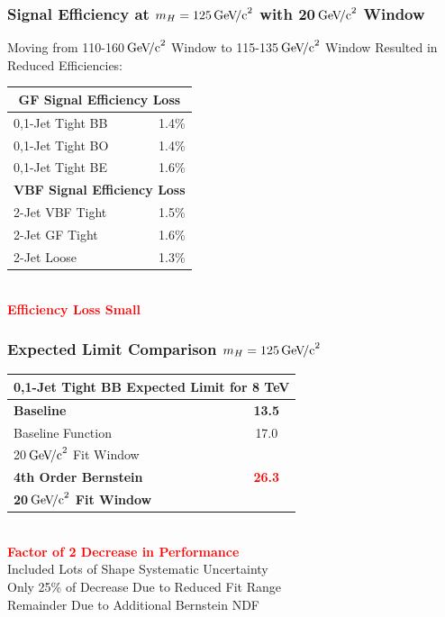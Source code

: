 \documentclass{beamer}
\newcommand{\GeVcc}{\ensuremath{\,\mathrm{Ge\kern -0.1em V\!/c}^2}}
\newcommand{\tredbf}[1]{\textcolor{red}{\bf #1}}
\begin{document}
\begin{frame}
\frametitle{Signal Efficiency at $m_H = 125 \GeVcc{}$ with 20\GeVcc{} Window}
\begin{center}
Moving from 110-160\GeVcc{} Window to 115-135\GeVcc{} Window Resulted in Reduced Efficiencies:
\\
\vspace{1em}
\begin{tabular}{|l|r|} \hline 
\multicolumn{2}{|c|}{ \bf GF Signal Efficiency Loss} \\ \hline
0,1-Jet Tight BB &  1.4\% \\ \hline
0,1-Jet Tight BO &  1.4\% \\ \hline
0,1-Jet Tight BE &  1.6\% \\ \hline
\multicolumn{2}{|c|}{ \bf VBF Signal Efficiency Loss} \\ \hline
2-Jet VBF Tight & 1.5\% \\ \hline
2-Jet GF Tight  & 1.6\% \\ \hline
2-Jet Loose     & 1.3\% \\ \hline
\end{tabular}
\\
\vspace{1em}
\tredbf{Efficiency Loss Small}
\end{center}

\end{frame}

\begin{frame}
\frametitle{Expected Limit Comparison $m_H=125\GeVcc{}$}
\begin{center}
\begin{tabular}{|l|c|} \hline
\multicolumn{2}{|c|}{ \bf 0,1-Jet Tight BB Expected Limit for 8 TeV} \\ \hline
\bf Baseline          &      \bf 13.5   \\ \hline
Baseline Function         & 17.0        \\
20\GeVcc{} Fit Window       &         \\ \hline
\bf 4th Order Bernstein         & \tredbf{26.3}        \\
\bf 20\GeVcc{} Fit Window       &         \\ \hline
\end{tabular}
\\ \vspace{1em}
\Large \tredbf{
Factor of 2 Decrease in Performance
}
\\
Included Lots of Shape Systematic Uncertainty
\\
Only 25\% of Decrease Due to Reduced Fit Range
\\
Remainder Due to Additional Bernstein NDF
\end{center}
\end{frame}
\end{document}
